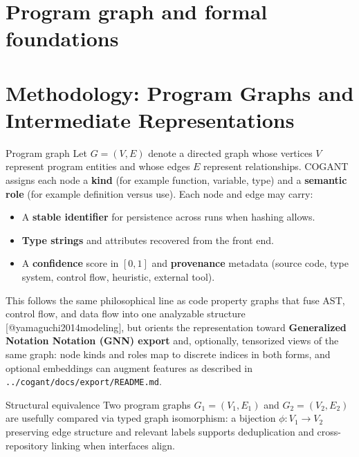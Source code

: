 \documentclass[
  ignorenonframetext,
]{beamer}
\author{\texorpdfstring{}{}}
\date{}
\providecommand{\tightlist}{%
  \setlength{\itemsep}{0pt}\setlength{\parskip}{0pt}}
\begin{document}
\section{Program graph and formal
foundations}\label{program-graph-and-formal-foundations}

\section{Methodology: Program Graphs and Intermediate
Representations}\label{methodology-program-graphs-and-intermediate-representations}

\begin{frame}[fragile]{Program graph}
\protect{}\label{program-graph}
Let \(G = (V, E)\) denote a directed graph whose vertices \(V\)
represent program entities and whose edges \(E\) represent
relationships. COGANT assigns each node a \textbf{kind} (for example
function, variable, type) and a \textbf{semantic role} (for example
definition versus use). Each node and edge may carry:

\begin{itemize}
\tightlist
\item
  A \textbf{stable identifier} for persistence across runs when hashing
  allows.
\item
  \textbf{Type strings} and attributes recovered from the front end.
\item
  A \textbf{confidence} score in \([0,1]\) and \textbf{provenance}
  metadata (source code, type system, control flow, heuristic, external
  tool).
\end{itemize}

This follows the same philosophical line as code property graphs that
fuse AST, control flow, and data flow into one analyzable structure
{[}@yamaguchi2014modeling{]}, but orients the representation toward
\textbf{Generalized Notation Notation (GNN) export} and, optionally,
tensorized views of the same graph: node kinds and roles map to discrete
indices in both forms, and optional embeddings can augment features as
described in \texttt{../cogant/docs/export/README.md}.

\begin{block}{Structural equivalence}
\protect{}\label{structural-equivalence}
Two program graphs \(G_1 = (V_1, E_1)\) and \(G_2 = (V_2, E_2)\) are
usefully compared via typed graph isomorphism: a bijection
\(\phi : V_1 \to V_2\) preserving edge structure and relevant labels
supports deduplication and cross-repository linking when interfaces
align.


\end{block}
\end{frame}
\end{document}
